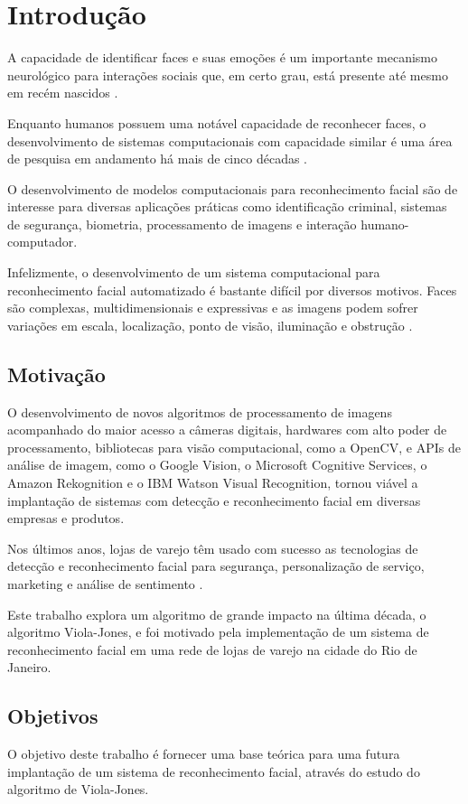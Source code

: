 \chapter{Introdução}

A capacidade de identificar faces e suas emoções é um importante mecanismo neurológico para interações sociais que, em certo grau, está presente até mesmo em recém nascidos \cite{morton1991conspec} \cite{fantz1961origin}.

Enquanto humanos possuem uma notável capacidade de reconhecer faces, o desenvolvimento de sistemas computacionais com capacidade similar é uma área de pesquisa em andamento há mais de cinco décadas \cite{bledsoe1964facial} \cite{chan1965man} \cite{bledsoe1966man} \cite{bledsoe1966model} \cite{boyer1991biographical} \cite{kelly1970visual} \cite{kanade1973picture}.

O desenvolvimento de modelos computacionais para reconhecimento facial são de interesse para diversas aplicações práticas como identificação criminal, sistemas de segurança, biometria, processamento de imagens e interação humano-computador.

Infelizmente, o desenvolvimento de um sistema computacional para reconhecimento facial automatizado é bastante difícil por diversos motivos. Faces são complexas, multidimensionais e expressivas \cite{turk1991eigenfaces} e as imagens podem sofrer variações em escala, localização, ponto de visão, iluminação e obstrução \cite{censtudy}.

\section{Motivação}

O desenvolvimento de novos algoritmos de processamento de imagens acompanhado do maior acesso a câmeras digitais, hardwares com alto poder de processamento, bibliotecas para visão computacional, como a OpenCV, e APIs de análise de imagem, como o Google Vision, o Microsoft Cognitive Services, o Amazon Rekognition e o IBM Watson Visual Recognition, tornou viável a implantação de sistemas com detecção e reconhecimento facial em diversas empresas e produtos.

Nos últimos anos, lojas de varejo têm usado com sucesso as tecnologias de detecção e reconhecimento facial para segurança, personalização de serviço, marketing e análise de sentimento \cite{fortune2015walmart} \cite{exame2018pontofrio} \cite{2017recfacial}.

Este trabalho explora um algoritmo de grande impacto na última década, o algoritmo Viola-Jones, e foi motivado pela implementação de um sistema de reconhecimento facial em uma rede de lojas de varejo na cidade do Rio de Janeiro.

\section{Objetivos}

O objetivo deste trabalho é fornecer uma base teórica para uma futura implantação de um sistema de reconhecimento facial, através do estudo do algoritmo de Viola-Jones.